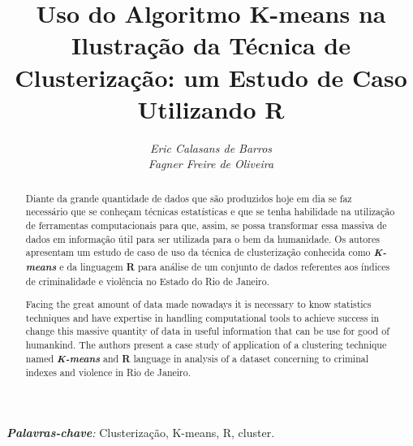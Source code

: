 \documentclass[a4paper, 12pt]{article}
\title{\textbf{Uso do Algoritmo K-means na Ilustração da Técnica de Clusterização:  um Estudo de Caso Utilizando R}}
\author{\textit{Eric Calasans de Barros}\\\textit{Fagner Freire de Oliveira}}
\begin{document}
	\maketitle
	
	{%
		\begin{abstract}
			Diante da grande quantidade de dados que são produzidos hoje em dia se faz necessário que se conheçam técnicas estatísticas e que se tenha habilidade na utilização de ferramentas computacionais para que, assim, se possa transformar essa massiva de dados em informação útil para ser utilizada para o bem da humanidade.  Os autores apresentam um estudo de caso de uso da técnica de clusterização conhecida como \textbf{\textit{K-means}} e da linguagem \textbf{R} para análise de um conjunto de dados referentes aos índices de criminalidade e violência no Estado do Rio de Janeiro.
		\end{abstract}
	}

	{%
		\begin{abstract}
			Facing the great amount of data made nowadays it is necessary to know statistics techniques and have expertise in handling computational tools to achieve success in change this massive quantity of data in useful information that can be use for good of humankind.  The authors present a case study of application of a clustering technique named \textit{\textbf{K-means}} and \textbf{R} language in analysis of a dataset concerning to criminal indexes and violence in Rio de Janeiro.
		\end{abstract}	
	}
	\vspace{1cm}
	\textit{\textbf{Palavras-chave}:} Clusterização, K-means, R, cluster.
	
	
\end{document}
